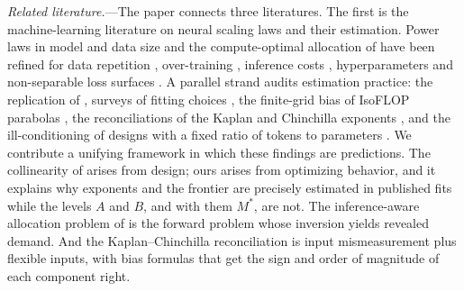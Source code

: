 \textit{Related literature.}---The paper connects three literatures. The first is the machine-learning literature
on neural scaling laws and their estimation. Power laws in model and data size \citep{hestness2017deep,
kaplan2020scaling} and the compute-optimal allocation of \citet{hoffmann2022training} have been refined for data
repetition \citep{muennighoff2023scaling}, over-training \citep{gadre2024language}, inference costs
\citep{sardana2024beyond}, hyperparameters \citep{li2025predictablea} and non-separable loss surfaces
\citep{li2025predictableb}. A parallel strand audits estimation practice: the replication of
\citet{besiroglu2024chinchilla}, surveys of fitting choices \citep{choshen2024hitchhikers, li2025misfitting}, the
finite-grid bias of IsoFLOP parabolas \citep{czech2026problems}, the reconciliations of the Kaplan and Chinchilla
exponents \citep{pearce2024reconciling, porian2024resolving}, and the ill-conditioning of designs with a fixed ratio
of tokens to parameters \citep{kricheli2026tokens}. We contribute a unifying framework in which these findings are
predictions. The collinearity of \citet{kricheli2026tokens} arises from design; ours arises from optimizing behavior,
and it explains why exponents and the frontier are precisely estimated in published fits while the levels $A$ and
$B$, and with them $M^*$, are not. The inference-aware
allocation problem of \citet{sardana2024beyond} is the forward problem whose inversion yields revealed demand. And
the Kaplan--Chinchilla reconciliation is input mismeasurement plus flexible inputs, with bias formulas that get the
sign and order of magnitude of each component right.

